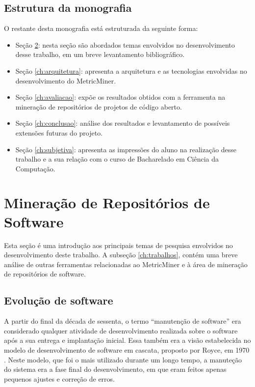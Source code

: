 \documentclass[a4paper, 12pt, twoside]{book}
\begin{document}
    \section{Estrutura da monografia}
        O restante desta monografia está estruturada da seguinte forma: 
        \begin{itemize}
            \item Seção \ref{ch:conceitos}: nesta seção são abordados temas 
                envolvidos no desenvolvimento desse trabalho, em um breve levantamento bibliográfico.
            \item Seção \ref{ch:arquitetura}: apresenta a arquitetura e as tecnologias
            envolvidas no desenvolvimento do MetricMiner.
            \item Seção \ref{ch:avaliacao}: expõe os resultados obtidos com a ferramenta 
                na mineração de repositórios de projetos de código aberto.
            \item Seção \ref{ch:conclusao}: análise dos resultados e levantamento 
                de possíveis extensões futuras do projeto.
            \item Seção \ref{ch:subjetiva}: apresenta as impressões do aluno na realização 
                desse trabalho e a sua relação com o curso de Bacharelado em Ciência da Computação.
        \end{itemize}
    
\chapter{Mineração de Repositórios de Software} \label{ch:conceitos}
    Esta seção é uma introdução aos principais temas de pesquisa envolvidos no desenvolvimento
    deste trabalho. A subseção \ref{ch:trabalhos}, contém uma breve análise de outras ferramentas
    relacionadas ao MetricMiner e à área de mineração de repositórios de software.

    \section{Evolução de software}
        A partir do final da década de sessenta, o termo ``manutenção de software'' era considerado qualquer 
        atividade de desenvolvimento realizada sobre o software após a sua entrega e implantação inicial.
        Essa também era a visão estabelecida no modelo de desenvolvimento de software em cascata, proposto 
        por Royce, em 1970 \cite{DBLP:series/springer/Mens08}. Neste modelo, que foi o mais 
        utilizado durante um longo tempo, a manuteção do sistema era a fase final do desenvolvimento, 
        em que eram feitos apenas pequenos ajustes e correção de erros.
        
\end{document}
